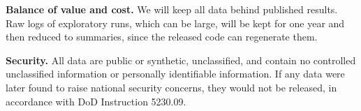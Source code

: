 \documentclass[12pt,letterpaper]{article}
\newcommand{\hd}[1]{\ifhmode\par\fi\addvspace{1pt}\noindent\textbf{#1}\hspace{0.35em}}
\begin{document}
\hd{Balance of value and cost.} We will keep all data behind published results. Raw logs of exploratory runs, which can be large, will be kept for one year and then reduced to summaries, since the released code can regenerate them.

\hd{Security.} All data are public or synthetic, unclassified, and contain no controlled unclassified information or personally identifiable information. If any data were later found to raise national security concerns, they would not be released, in accordance with DoD Instruction 5230.09.
\normalsize

\clearpage
\renewcommand{\thepage}{R-\arabic{page}}
\setcounter{page}{1}
\renewcommand{\bibsection}{\section*{References Cited}}
\begingroup
\small
\setlength{\bibsep}{2.5pt}
\end{document}
